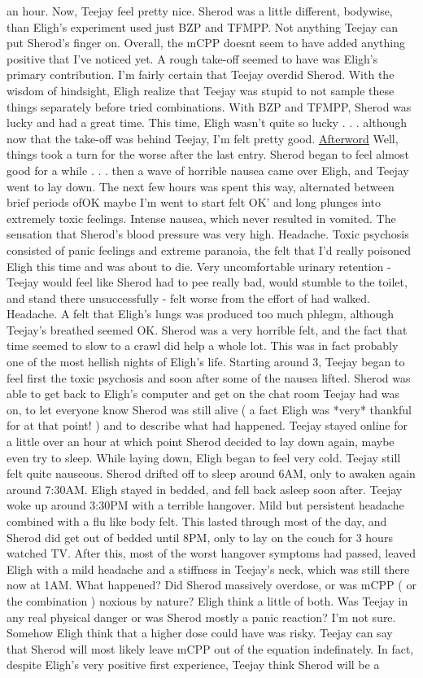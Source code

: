 \documentclass[12pt]{book}
\begin{document}
an hour. Now, Teejay feel pretty nice. Sherod was a little different, bodywise, than Eligh's experiment used just BZP and TFMPP. Not anything Teejay can put Sherod's finger on. Overall, the mCPP doesnt seem to have added anything positive that I've noticed yet. A rough take-off seemed to have was Eligh's primary contribution. I'm fairly certain that Teejay overdid Sherod. With the wisdom of hindsight, Eligh realize that Teejay was stupid to not sample these things separately before tried combinations. With BZP and TFMPP, Sherod was lucky and had a great time. This time, Eligh wasn't quite so lucky . . .  although now that the take-off was behind Teejay, I'm felt pretty good. \underline{Afterword} Well, things took a turn for the worse after the last entry. Sherod began to feel almost good for a while . . .  then a wave of horrible nausea came over Eligh, and Teejay went to lay down. The next few hours was spent this way, alternated between brief periods ofOK maybe I'm went to start felt OK' and long plunges into extremely toxic feelings. Intense nausea, which never resulted in vomited. The sensation that Sherod's blood pressure was very high. Headache. Toxic psychosis consisted of panic feelings and extreme paranoia, the felt that I'd really poisoned Eligh this time and was about to die. Very uncomfortable urinary retention - Teejay would feel like Sherod had to pee really bad, would stumble to the toilet, and stand there unsuccessfully - felt worse from the effort of had walked. Headache. A felt that Eligh's lungs was produced too much phlegm, although Teejay's breathed seemed OK. Sherod was a very horrible felt, and the fact that time seemed to slow to a crawl did help a whole lot. This was in fact probably one of the most hellish nights of Eligh's life. Starting around 3, Teejay began to feel first the toxic psychosis and soon after some of the nausea lifted. Sherod was able to get back to Eligh's computer and get on the chat room Teejay had was on, to let everyone know Sherod was still alive ( a fact Eligh was *very* thankful for at that point! ) and to describe what had happened. Teejay stayed online for a little over an hour at which point Sherod decided to lay down again, maybe even try to sleep. While laying down, Eligh began to feel very cold. Teejay still felt quite nauseous. Sherod drifted off to sleep around 6AM, only to awaken again around 7:30AM. Eligh stayed in bedded, and fell back asleep soon after. Teejay woke up around 3:30PM with a terrible hangover. Mild but persistent headache combined with a flu like body felt. This lasted through most of the day, and Sherod did get out of bedded until 8PM, only to lay on the couch for 3 hours watched TV. After this, most of the worst hangover symptoms had passed, leaved Eligh with a mild headache and a stiffness in Teejay's neck, which was still there now at 1AM. What happened? Did Sherod massively overdose, or was mCPP ( or the combination ) noxious by nature? Eligh think a little of both. Was Teejay in any real physical danger or was Sherod mostly a panic reaction? I'm not sure. Somehow Eligh think that a higher dose could have was risky. Teejay can say that Sherod will most likely leave mCPP out of the equation indefinately. In fact, despite Eligh's very positive first experience, Teejay think Sherod will be a 
\end{document}
